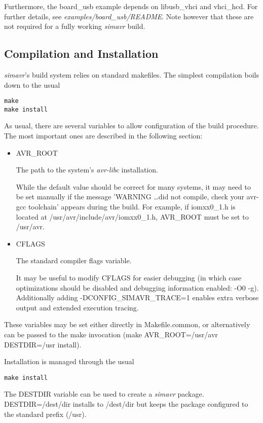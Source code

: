 Furthermore, the board\_usb example depends on libusb\_vhci and vhci\_hcd. For
further details, see \emph{examples/board\_usb/README}. Note however that these
are not required for a fully working \emph{simavr} build.

\subsection{Compilation and Installation}

\emph{simavr}'s build system relies on standard makefiles. The simplest compilation
boils down to the usual

\begin{verbatim}
make
make install
\end{verbatim}

As usual, there are several variables to allow configuration of the build
procedure. The most important ones are described in the following section:

\begin{itemize}
\item AVR\_ROOT

The path to the system's \emph{avr-libc} installation.

While the default value
should be correct for many systems, it may need to be set manually if the
message 'WARNING \ldots did not compile, check your avr-gcc
toolchain' appears during the build. For example, if iomxx0\_1.h is located at
/usr/avr/include/avr/iomxx0\_1.h, AVR\_ROOT must be set to /usr/avr.

\item CFLAGS

The standard compiler flags variable.

It may be useful to modify CFLAGS for easier debugging (in which case
optimizations should be disabled and debugging information enabled: -O0 -g).
Additionally adding -DCONFIG\_SIMAVR\_TRACE=1 enables extra verbose output and
extended execution tracing.
\end{itemize}

These variables may be set either directly in Makefile.common, or alternatively
can be passed to the make invocation (make AVR\_ROOT=/usr/avr DESTDIR=/usr
install).

Installation is managed through the usual
\begin{verbatim}
make install                                           
\end{verbatim}

The DESTDIR variable can be used to create a \emph{simavr} package. DESTDIR=/dest/dir
installs to /dest/dir but keeps the package configured to the standard prefix
(/usr).


